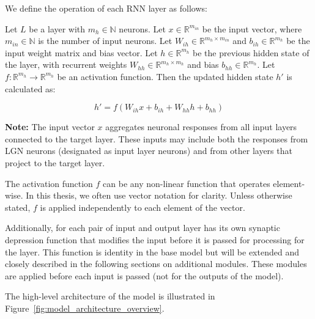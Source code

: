 We define the operation of each RNN layer as follows:

\begin{defn}
    Let $L$ be a layer with $m_h \in \mathbb{N}$ neurons. Let $x \in \mathbb{R}^{m_{in}}$ be the input vector, where $m_{in} \in \mathbb{N}$ is the number of input neurons. Let $W_{ih} \in \mathbb{R}^{m_h \times m_{in}}$ and $b_{ih} \in \mathbb{R}^{m_h}$ be the input weight matrix and bias vector. Let $h \in \mathbb{R}^{m_h}$ be the previous hidden state of the layer, with recurrent weights $W_{hh} \in \mathbb{R}^{m_h \times m_h}$ and bias $b_{hh} \in \mathbb{R}^{m_h}$. Let $f: \mathbb{R}^{m_h} \to \mathbb{R}^{m_h}$ be an activation function. Then the updated hidden state $h'$ is calculated as:
    
    $$h' = f\left(W_{ih}x + b_{ih} + W_{hh}h + b_{hh}\right)$$

    \textbf{Note:} The input vector $x$ aggregates neuronal responses from all input layers connected to the target layer. These inputs may include both the responses from LGN neurons (designated as input layer neurons) and from other layers that project to the target layer. 
\end{defn}
\label{def:base_neuron}

The activation function $f$ can be any non-linear function that operates element-wise. In this thesis, we often use vector notation for clarity. Unless otherwise stated, $f$ is applied independently to each element of the vector.

Additionally, for each pair of input and output layer has its own synaptic depression function that modifies the input before it is passed for processing for the layer. This function is identity in the base model but will be extended and closely described in the following sections on additional modules. These modules are applied before each input is passed (not for the outputs of the model).

The high-level architecture of the model is illustrated in Figure~\ref{fig:model_architecture_overview}.

